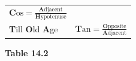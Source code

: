 {{\begin{center}
\begin{tabular}[t]{|l|l|}
                  \begin{math}\mathbf{C}\mathrm{os}=\frac{\mathbf{A}\mathrm{djacent}}{\mathbf{H}\mathrm{ypotenuse}}\end{math}
     \tabularnewline\cline{1-1}\cline{2-2}
    
    
        \textbf{T}ill \textbf{O}ld \textbf{A}ge &
    
    
        
                  \begin{math}\mathbf{T}\mathrm{an}=\frac{\mathbf{O}\mathrm{pposite}}{\mathbf{A}\mathrm{djacent}}\end{math}
     \tabularnewline\cline{1-1}\cline{2-2}
    \end{tabular}
      \end{center}
    \begin{center}{\small\bfseries Table 14.2}\end{center}
    
    \addtocounter{footnote}{-0}
    
          }{ %
        
    
        \begin{center}
      
      \label{m39408*id79953}
      
    \noindent
      \tablelasttail{}
      \begin{xtabular}[t]{|l|l|}\hline
    

\end{xtabular}
\end{center}}}
